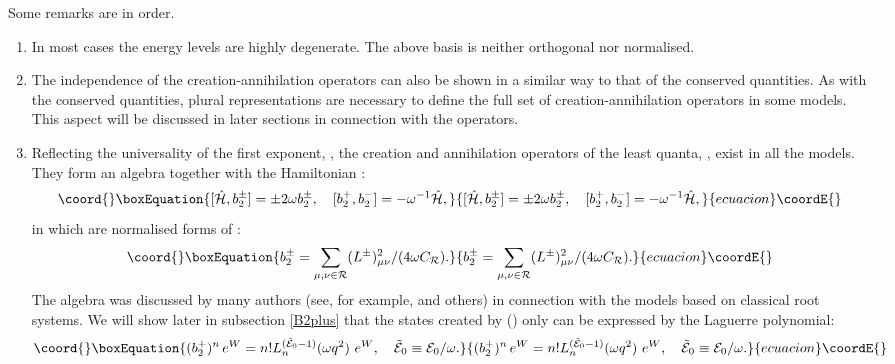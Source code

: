 \documentclass[a4paper,12pt]{article}
\begin{document}
Some remarks are in order.
\begin{enumerate}
\item
In most cases the energy levels are highly degenerate.
The above basis is neither
orthogonal nor normalised.
\item
The independence of the creation-annihilation operators can also be shown
in a similar way to that of the conserved quantities.
 As with the
conserved quantities,  plural representations are  necessary to define
the full set of creation-annihilation operators in some models.
This aspect will be discussed in later sections in
connection with the \myHighlight{\(\ell\)}\coordHE{} operators.
\item
Reflecting the universality of the first exponent, \coordHE{},
the creation and annihilation operators of the
least quanta, \myHighlight{\(2\omega\)}\coordHE{}, exist in all the models.
They form an \coordHE{} algebra
together with the Hamiltonian \coordHE{}:
\begin{equation}\coord{}\boxEquation{
   [\hat{\cal H},b^\pm_2]=\pm2\omega b^\pm_2,\quad
   [b_2^+,b_2^-]=-\omega^{-1}\hat{\cal H},
}{
   [\hat{\cal H},b^\pm_2]=\pm2\omega b^\pm_2,\quad
   [b_2^+,b_2^-]=-\omega^{-1}\hat{\cal H},
}{ecuacion}\coordE{}\end{equation}
in which \coordHE{} are  normalised forms of \coordHE{}:
\begin{equation}\coord{}\boxEquation{
   b_2^\pm=\sum_{\mu,\nu\in{\cal R}}(L^\pm)^2_{\mu\nu}/(4\omega C_{\cal
   R}).
\label{normb2def}
}{
   b_2^\pm=\sum_{\mu,\nu\in{\cal R}}(L^\pm)^2_{\mu\nu}/(4\omega C_{\cal
   R}).
}{ecuacion}\coordE{}\end{equation}
 The \coordHE{} algebra was discussed by many authors
(see, for example, \cite{Pere1,Gamb,Br,Heck2} and others) in connection
with  the models based on classical root systems. We will show later in
subsection
\ref{B2plus} that the
states created by
\coordHE{} (\coordHE{}) only can be expressed by  the Laguerre polynomial:
\begin{equation}\coord{}\boxEquation{
   (b_2^+)^n\,e^W=n! L^{(\tilde {\cal E}_0-1)}_n(\omega q^2)~e^W,\quad
   \tilde {\cal E}_0\equiv{\cal E}_0/\omega.
   \label{B2series}
}{
   (b_2^+)^n\,e^W=n! L^{(\tilde {\cal E}_0-1)}_n(\omega q^2)~e^W,\quad
   \tilde {\cal E}_0\equiv{\cal E}_0/\omega.
   }{ecuacion}\coordE{}\end{equation}

\end{enumerate}
\end{document}
